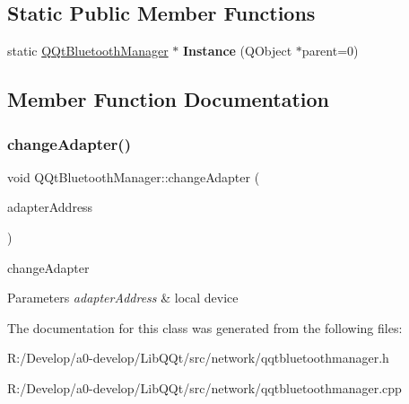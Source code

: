 \subsection*{Static Public Member Functions}
\begin{DoxyCompactItemize}
\item 
\mbox{\label{class_q_qt_bluetooth_manager_ae5653f2d96a69d47556c83a33e608097}} 
static \mbox{\hyperlink{class_q_qt_bluetooth_manager}{Q\+Qt\+Bluetooth\+Manager}} $\ast$ {\bfseries Instance} (Q\+Object $\ast$parent=0)
\end{DoxyCompactItemize}


\subsection{Member Function Documentation}
\mbox{\label{class_q_qt_bluetooth_manager_a78509207159d97faa2a2ade55a441226}} 
\subsubsection{\texorpdfstring{change\+Adapter()}{changeAdapter()}}
{\footnotesize\ttfamily void Q\+Qt\+Bluetooth\+Manager\+::change\+Adapter (\begin{DoxyParamCaption}\item[{Q\+Bluetooth\+Address \&}]{adapter\+Address }\end{DoxyParamCaption})}



change\+Adapter 


\begin{DoxyParams}{Parameters}
{\em adapter\+Address} & local device \\
\hline
\end{DoxyParams}


The documentation for this class was generated from the following files\+:\begin{DoxyCompactItemize}
\item 
R\+:/\+Develop/a0-\/develop/\+Lib\+Q\+Qt/src/network/qqtbluetoothmanager.\+h\item 
R\+:/\+Develop/a0-\/develop/\+Lib\+Q\+Qt/src/network/qqtbluetoothmanager.\+cpp\end{DoxyCompactItemize}
